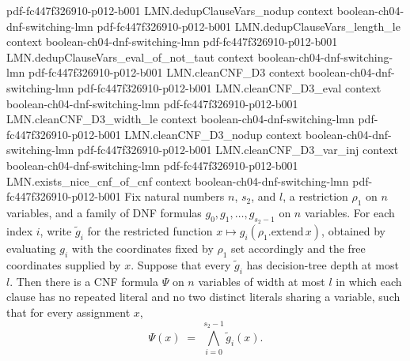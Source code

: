 \begin{lemma}
  {pdf-fc447f326910-p012-b001}
\proofstep
  {LMN.dedupClauseVars_nodup}
  {context}
  {boolean-ch04-dnf-switching-lmn}
  {pdf-fc447f326910-p012-b001}
\proofstep
  {LMN.dedupClauseVars_length_le}
  {context}
  {boolean-ch04-dnf-switching-lmn}
  {pdf-fc447f326910-p012-b001}
\proofstep
  {LMN.dedupClauseVars_eval_of_not_taut}
  {context}
  {boolean-ch04-dnf-switching-lmn}
  {pdf-fc447f326910-p012-b001}
\proofstep
  {LMN.cleanCNF_D3}
  {context}
  {boolean-ch04-dnf-switching-lmn}
  {pdf-fc447f326910-p012-b001}
\proofstep
  {LMN.cleanCNF_D3_eval}
  {context}
  {boolean-ch04-dnf-switching-lmn}
  {pdf-fc447f326910-p012-b001}
\proofstep
  {LMN.cleanCNF_D3_width_le}
  {context}
  {boolean-ch04-dnf-switching-lmn}
  {pdf-fc447f326910-p012-b001}
\proofstep
  {LMN.cleanCNF_D3_nodup}
  {context}
  {boolean-ch04-dnf-switching-lmn}
  {pdf-fc447f326910-p012-b001}
\proofstep
  {LMN.cleanCNF_D3_var_inj}
  {context}
  {boolean-ch04-dnf-switching-lmn}
  {pdf-fc447f326910-p012-b001}
\proofstep
  {LMN.exists_nice_cnf_of_cnf}
  {context}
  {boolean-ch04-dnf-switching-lmn}
  {pdf-fc447f326910-p012-b001}
Fix natural numbers $n$, $s_2$, and $l$, a restriction $\rho_1$ on $n$ variables, and a
family of DNF formulas $g_0, g_1, \dots, g_{s_2-1}$ on $n$ variables. For each index
$i$, write $\tilde g_i$ for the restricted function $x \mapsto
g_i(\rho_1.\mathrm{extend}\,x)$, obtained by evaluating $g_i$ with the coordinates fixed
by $\rho_1$ set accordingly and the free coordinates supplied by $x$. Suppose that every
$\tilde g_i$ has decision-tree depth at most $l$. Then there is a CNF formula $\Psi$ on
$n$ variables of width at most $l$ in which each clause has no repeated literal and no
two distinct literals sharing a variable, such that for every assignment $x$,
\[
\Psi(x) \;=\; \bigwedge_{i=0}^{s_2-1} \tilde g_i(x).
\]
\end{lemma}

